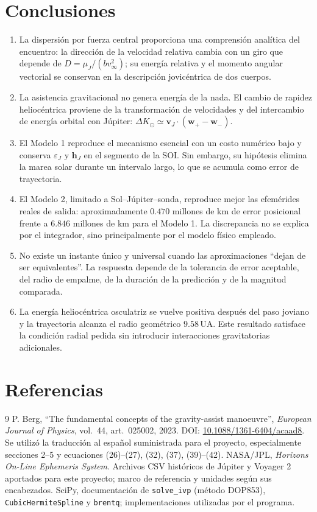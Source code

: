 \documentclass[11pt,a4paper]{article}
\newcommand{\vect}[1]{\bm{#1}}
\newcommand{\muJ}{\mu_{J}}
\newcommand{\vJ}{\vect v_{J}}
\begin{document}
\section{Conclusiones}
\begin{enumerate}[label=\textbf{\arabic*.}]
\item La dispersión por fuerza central proporciona una comprensión analítica del encuentro: la dirección de la velocidad relativa cambia con un giro que depende de $D=\muJ/(bv_\infty^2)$; su energía relativa y el momento angular vectorial se conservan en la descripción jovicéntrica de dos cuerpos.
\item La asistencia gravitacional no genera energía de la nada. El cambio de rapidez heliocéntrica proviene de la transformación de velocidades y del intercambio de energía orbital con Júpiter: $\Delta K_\odot\simeq\vJ\cdot(\vect w_+-\vect w_-)$.
\item El Modelo 1 reproduce el mecanismo esencial con un costo numérico bajo y conserva $\varepsilon_J$ y $\vect h_J$ en el segmento de la SOI. Sin embargo, su hipótesis elimina la marea solar durante un intervalo largo, lo que se acumula como error de trayectoria.
\item El Modelo 2, limitado a Sol--Júpiter--sonda, reproduce mejor las efemérides reales de salida: aproximadamente $0.470$ millones de km de error posicional frente a $6.846$ millones de km para el Modelo 1. La discrepancia no se explica por el integrador, sino principalmente por el modelo físico empleado.
\item No existe un instante único y universal cuando las aproximaciones ``dejan de ser equivalentes''. La respuesta depende de la tolerancia de error aceptable, del radio de empalme, de la duración de la predicción y de la magnitud comparada.
\item La energía heliocéntrica osculatriz se vuelve positiva después del paso joviano y la trayectoria alcanza el radio geométrico $9.58\,\mathrm{UA}$. Este resultado satisface la condición radial pedida sin introducir interacciones gravitatorias adicionales.
\end{enumerate}

\section{Referencias}
\begin{thebibliography}{9}
 P. Berg, ``The fundamental concepts of the gravity-assist manoeuvre'', \emph{European Journal of Physics}, vol.~44, art.~025002, 2023. DOI: \href{https://doi.org/10.1088/1361-6404/acaad8}{10.1088/1361-6404/acaad8}. Se utilizó la traducción al español suministrada para el proyecto, especialmente secciones 2--5 y ecuaciones (26)--(27), (32), (37), (39)--(42).
 NASA/JPL, \emph{Horizons On-Line Ephemeris System}. Archivos CSV históricos de Júpiter y Voyager 2 aportados para este proyecto; marco de referencia y unidades según sus encabezados.
 SciPy, documentación de \texttt{solve\_ivp} (método DOP853), \texttt{CubicHermiteSpline} y \texttt{brentq}; implementaciones utilizadas por el programa.
\end{thebibliography}
\end{document}
